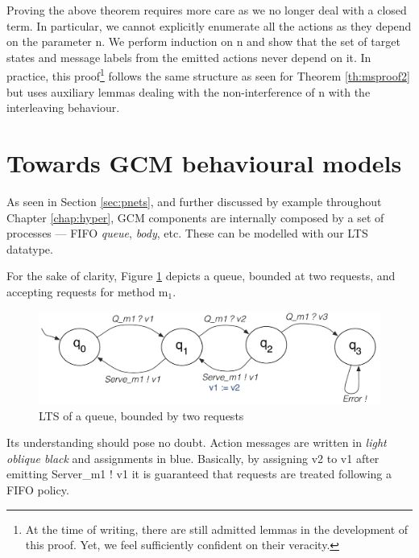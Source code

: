					

	Proving the above theorem requires more care as we no longer deal with a closed term.
	In particular, we cannot explicitly enumerate all the \textsf{actions} as they depend on 
	the parameter \textsf{n}.	We perform induction on \textsf{n} and show that
	the set of target states and message labels from the emitted \textsf{actions} never depend on it. 
	In practice, this proof\footnote{At the time of writing, there are still admitted lemmas in the development of this proof. 
	Yet, we feel sufficiently confident on their veracity.}
	follows the same structure as seen for Theorem \ref{th:msproof2} but 	uses auxiliary lemmas 
	dealing with the non-interference of \textsf{n} with the interleaving behaviour.
	
		
		
\section{Towards GCM behavioural models}
\label{sec:gcmpnets}


	 As seen in Section \ref{sec:pnets}, and further discussed by example throughout Chapter \ref{chap:hyper},
   \ac{GCM} components are internally composed by a set of processes --- \ac{FIFO} \textit{queue}, \textit{body}, 
   etc. These can be modelled with our \textsf{LTS} datatype.
   
   
	For the sake of clarity, Figure \ref{fig:gcmqueue2} depicts a queue, bounded at two requests, and accepting
	requests for method \textsf{m$_1$}.
	
	\begin{figure}[H]
		 \centering
		\includegraphics[scale=0.6]{figures/chapter6/gcmqueue2.pdf}
		\caption{LTS of a queue, bounded by two requests}
		\label{fig:gcmqueue2}		
	\end{figure}		
	
	\noindent Its understanding should pose no doubt. \textsf{Action} \textsf{messages} are written
	in \textit{light oblique black} and \textsf{assignments} in blue. Basically, by assigning \textsf{v2} to
	\textsf{v1} after emitting \textsf{Server\_m1 ! v1} it is guaranteed that requests are treated following
	a \ac{FIFO} policy.
		
